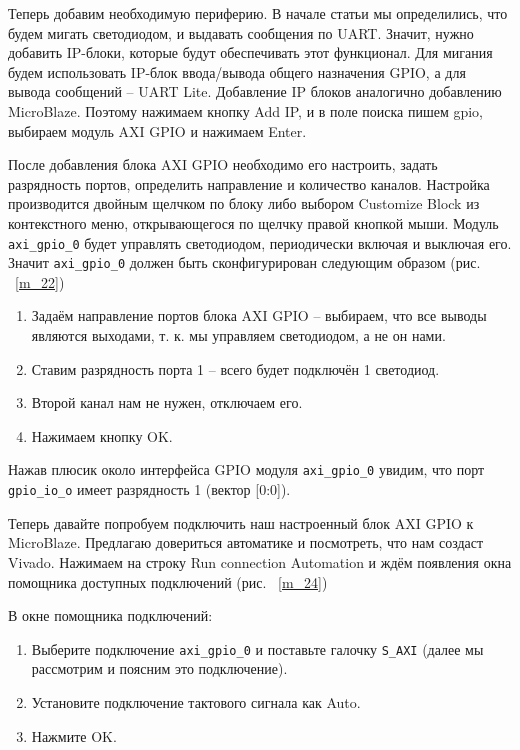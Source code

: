\documentclass[a4paper,oneside ,10pt]{extreport}
\begin{document}
Теперь добавим необходимую периферию. В начале статьи мы определились, 
что будем мигать светодиодом, и выдавать сообщения по UART. Значит, нужно 
добавить IP-блоки, которые будут обеспечивать этот функционал. Для мигания 
будем использовать IP-блок ввода/вывода общего назначения GPIO, а для вывода сообщений – UART Lite.
Добавление IP блоков аналогично добавлению MicroBlaze. Поэтому нажимаем 
кнопку Add IP, и в поле поиска пишем gpio, выбираем модуль AXI GPIO и нажимаем 
Enter.

После добавления блока AXI GPIO необходимо его настроить, задать 
разрядность портов, определить направление и количество каналов. Настройка 
производится двойным щелчком по блоку либо выбором Customize Block из 
контекстного меню, открывающегося по щелчку правой кнопкой мыши. Модуль
\verb|axi_gpio_0| будет управлять светодиодом, периодически включая и выключая его. 
Значит \verb|axi_gpio_0| должен быть сконфигурирован следующим образом (рис. ~\ref{m_22})

\begin{enumerate}
	\item Задаём направление портов блока AXI GPIO – выбираем, что все выводы 
являются выходами, т. к. мы управляем светодиодом, а не он нами.
	\item Ставим разрядность порта 1 – всего будет подключён 1 светодиод.
	\item Второй канал нам не нужен, отключаем его.
	\item Нажимаем кнопку OK.
\end{enumerate}

Нажав плюсик около интерфейса GPIO модуля \verb|axi_gpio_0| увидим, что порт 
\verb|gpio_io_o| имеет разрядность 1 (вектор [0:0]).

Теперь давайте попробуем подключить наш настроенный блок AXI GPIO к 
MicroBlaze. Предлагаю довериться автоматике и посмотреть, что нам создаст 
Vivado. Нажимаем на строку Run connection Automation и ждём 
появления окна помощника доступных подключений (рис. ~\ref{m_24})

В окне помощника подключений:
\begin{enumerate}
	\item Выберите подключение  \verb|axi_gpio_0| и поставьте галочку \verb|S_AXI| (далее мы 
рассмотрим и поясним это подключение).
	\item Установите подключение тактового сигнала как Auto.
	\item Нажмите OK.
\end{enumerate}
\end{document}
